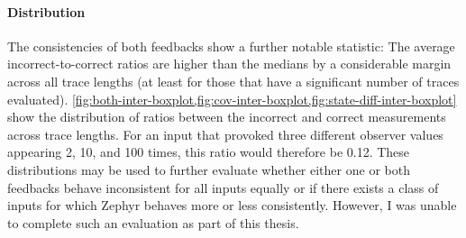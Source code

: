 \documentclass[twocolumn]{article}
\begin{document}
\paragraph{Distribution}

The consistencies of both feedbacks show a further notable statistic: The average incorrect-to-correct ratios are higher than the medians by a considerable margin across all trace lengths (at least for those that have a significant number of traces evaluated). \cref{fig:both-inter-boxplot,fig:cov-inter-boxplot,fig:state-diff-inter-boxplot} show the distribution of ratios between the incorrect and correct measurements across trace lengths. For an input that provoked three different observer values appearing 2, 10, and 100 times, this ratio would therefore be 0.12. These distributions may be used to further evaluate whether either one or both feedbacks behave inconsistent for all inputs equally or if there exists a class of inputs for which Zephyr behaves more or less consistently. However, I was unable to complete such an evaluation as part of this thesis.
\end{document}
